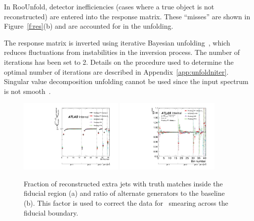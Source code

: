 In RooUnfold, detector inefficiencies (cases where a true object is not reconstructed) are entered into the response matrix.  These
``misses'' are shown in Figure~\ref{f:res}(b) and are accounted for in the unfolding. 

The response matrix is inverted using iterative Bayesian unfolding~\cite{DAgostini:1994zf}, which reduces fluctuations from instabilities in 
the inversion process. The number of iterations has been set to 2. Details on the procedure used to determine the optimal number of iterations are described in Appendix~\ref{app:unfoldniter}. 
Singular value decomposition unfolding cannot be used since the input spectrum is not smooth~\cite{svd}.
\begin{figure}
\includegraphics[width=0.45\textwidth]{fig/Unfolding/FeedIn.pdf}
\includegraphics[width=0.45\textwidth]{fig/Unfolding/FeedInFrac.pdf}
\caption{Fraction of reconstructed extra jets with truth matches inside the fiducial region (a) and ratio of alternate generators to the baseline (b). This factor is used to correct the data for \pt\ smearing across the fiducial boundary.}
\label{fig:feedin}
\end{figure}

